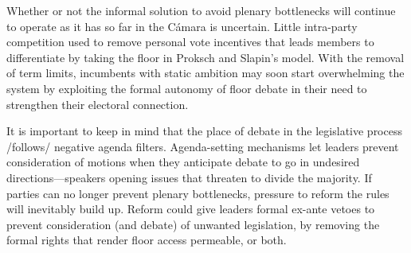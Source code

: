 Whether or not the informal solution to avoid plenary bottlenecks will continue to operate as it has so far in the Cámara is uncertain. Little intra-party competition used to remove personal vote incentives that leads members to differentiate by taking the floor in Proksch and Slapin's model. With the removal of term limits, incumbents with static ambition may soon start overwhelming the system by exploiting the formal autonomy of floor debate in their need to strengthen their electoral connection.

It is important to keep in mind that the place of debate in the legislative process /follows/ negative agenda filters. Agenda-setting mechanisms let leaders prevent consideration of motions when they anticipate debate to go in undesired directions---speakers opening issues that threaten to divide the majority. If parties can no longer prevent plenary bottlenecks, pressure to reform the rules will inevitably build up. Reform could give leaders formal ex-ante vetoes to prevent consideration (and debate) of unwanted legislation, by removing the formal rights that render floor access permeable, or both. 






